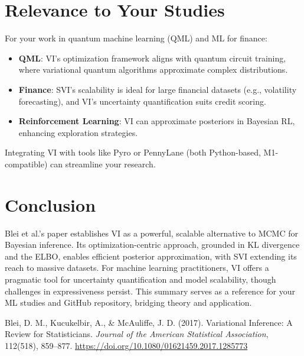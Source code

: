 \documentclass[11pt]{article}
\begin{document}
\section{Relevance to Your Studies}
For your work in quantum machine learning (QML) and ML for finance:
\begin{itemize}[leftmargin=*]
    \item \textbf{QML}: VI’s optimization framework aligns with quantum circuit training, where variational quantum algorithms approximate complex distributions.
    \item \textbf{Finance}: SVI’s scalability is ideal for large financial datasets (e.g., volatility forecasting), and VI’s uncertainty quantification suits credit scoring.
    \item \textbf{Reinforcement Learning}: VI can approximate posteriors in Bayesian RL, enhancing exploration strategies.
\end{itemize}
Integrating VI with tools like Pyro or PennyLane (both Python-based, M1-compatible) can streamline your research.

\section{Conclusion}
Blei et al.’s paper establishes VI as a powerful, scalable alternative to MCMC for Bayesian inference. Its optimization-centric approach, grounded in KL divergence and the ELBO, enables efficient posterior approximation, with SVI extending its reach to massive datasets. For machine learning practitioners, VI offers a pragmatic tool for uncertainty quantification and model scalability, though challenges in expressiveness persist. This summary serves as a reference for your ML studies and GitHub repository, bridging theory and application.

\begin{thebibliography}{1}
Blei, D. M., Kucukelbir, A., \& McAuliffe, J. D. (2017). Variational Inference: A Review for Statisticians. \textit{Journal of the American Statistical Association}, 112(518), 859--877. \url{https://doi.org/10.1080/01621459.2017.1285773}
\end{thebibliography}
\end{document}
